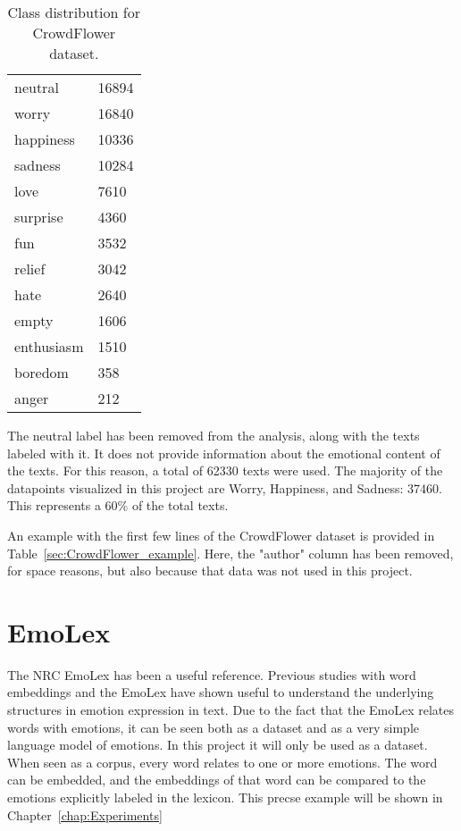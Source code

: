 \begin{table}
    \centering
    \begin{tabular}{|l|l|}
    \hline
      neutral     &  16894 \\
      worry       &  16840 \\
      happiness   &  10336 \\
      sadness     &  10284 \\
      love        &   7610 \\
      surprise    &   4360 \\
      fun         &   3532 \\
      relief      &   3042 \\
      hate        &   2640 \\
      empty       &   1606 \\
      enthusiasm  &   1510 \\
      boredom     &    358 \\
      anger       &    212 \\
    \hline
    \end{tabular}
    \caption{Class distribution for CrowdFlower dataset.}\label{tab:CrowdFlower_distribution}
\end{table}
The neutral label has been removed from the analysis, along with the texts labeled with it. It does not provide information about the emotional content of the texts.
For this reason, a total of 62330 texts were used. The majority of the datapoints visualized in this project are Worry, Happiness, and Sadness: 37460. This represents a 60\% of the total texts.

An example with the first few lines of the CrowdFlower dataset is provided in Table~\ref{sec:CrowdFlower_example}. Here, the "author" column has been removed, for space reasons, but also because that data was not used in this project.

\section{EmoLex}\label{sec:EmoLex}
The NRC EmoLex has been a useful reference. Previous studies with word embeddings and the EmoLex have shown useful to understand the underlying structures in emotion expression in text. Due to the fact that the EmoLex relates words with emotions, it can be seen both as a dataset and as a very simple language model of emotions. In this project it will only be used as a dataset. When seen as a corpus, every word relates to one or more emotions. The word can be embedded, and the embeddings of that word can be compared to the emotions explicitly labeled in the lexicon. This precse example will be shown in Chapter~\ref{chap:Experiments}

